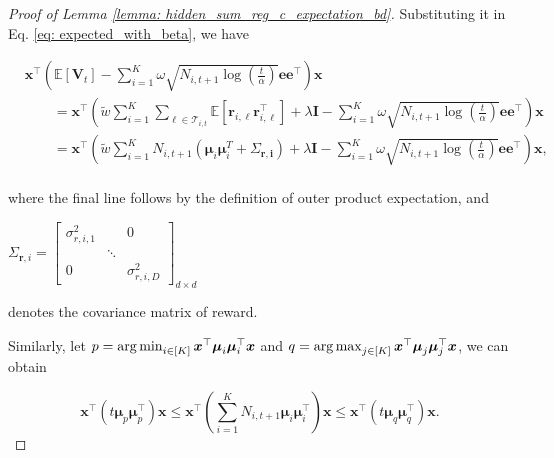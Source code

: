 \begin{proof}[Proof of Lemma \ref{lemma: hidden_sum_reg_c_expectation_bd}]
Substituting it in Eq. \ref{eq: expected_with_beta}, we have 

\begin{equation}
\begin{aligned}
\label{eq: expected_with_beta_2}
& \boldsymbol{x}^{\top} 
\left(
\mathbb{E} \left[\boldsymbol{V}_{t} \right]
- 
\sum_{i=1}^{K}
\omega \sqrt{ N_{i,t+1} \log \left( \frac{t}{\alpha} \right)} \boldsymbol{e e}^{\top}
\right)
\boldsymbol{x} \\
& \qquad = 
\boldsymbol{x}^{\top} 
\left( 
\tilde{w}
\sum_{i=1}^{K}
\sum_{\ell \in \mathcal{T}_{i,t}} \mathbb{E} \left[ \boldsymbol{r}_{i,\ell} \boldsymbol{r}_{i,\ell}^{\top} \right]
+ \lambda \boldsymbol{I}
-
\sum_{i=1}^{K} \omega \sqrt{ N_{i,t+1} \log \left( \frac{t}{\alpha} \right)} \boldsymbol{e e}^{\top}
\right)
\boldsymbol{x} \\
& \qquad = 
\boldsymbol{x}^{\top} 
\left( 
\tilde{w}
\sum_{i=1}^{K} N_{i,t+1} \left(
 \boldsymbol{\mu}_{i} \boldsymbol{\mu}_{i}^T + \Sigma_{\boldsymbol{r,i}} \right)
+ \lambda \boldsymbol{I}
-
\sum_{i=1}^{K} \omega \sqrt{ N_{i,t+1} \log \left( \frac{t}{\alpha} \right)} \boldsymbol{e e}^{\top}
\right)
\boldsymbol{x}, \\
\end{aligned}
\end{equation}

where the final line follows by the definition of outer product expectation, and
\begin{small}
$\Sigma_{\boldsymbol{r},i} = 
\begin{bmatrix}
\sigma_{r,i,1}^2 & & 0\\
  & \ddots &\\
0 & & \sigma_{r,i,D}^2
\end{bmatrix}_{d \times d}$ 
\end{small}
denotes the covariance matrix of reward.

Similarly, let $p = \operatorname*{arg\,min}_{i \in [K]} \boldsymbol{x}^{\top} \boldsymbol{\mu}_{i} \boldsymbol{\mu}_{i}^{\top} \boldsymbol{x}$ and $
q = \operatorname*{arg\,max}_{j \in [K]} \boldsymbol{x}^{\top} \boldsymbol{\mu}_{j} \boldsymbol{\mu}_{j}^{\top} \boldsymbol{x}$, we can obtain

\[
\boldsymbol{x}^{\top} \left( t \boldsymbol{\mu}_{p} \boldsymbol{\mu}_{p}^{\top}
\right) \boldsymbol{x} 
\leq
\boldsymbol{x}^{\top} \left( \sum_{i=1}^{K} N_{i,t+1} \boldsymbol{\mu}_{i} \boldsymbol{\mu}_{i}^{\top}
\right) \boldsymbol{x} 
\leq 
\boldsymbol{x}^{\top} \left( t \boldsymbol{\mu}_{q} \boldsymbol{\mu}_{q}^{\top}
\right) \boldsymbol{x}. 
\]


\end{proof}
